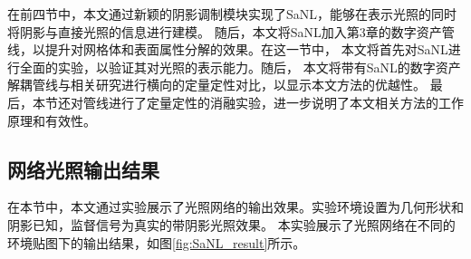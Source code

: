 在前四节中，本文通过新颖的阴影调制模块实现了SaNL，能够在表示光照的同时将阴影与直接光照的信息进行建模。
随后，本文将SaNL加入第3章的数字资产管线，以提升对网格体和表面属性分解的效果。在这一节中，
本文将首先对SaNL进行全面的实验，以验证其对光照的表示能力。随后，
本文将带有SaNL的数字资产解耦管线与相关研究进行横向的定量定性对比，以显示本文方法的优越性。
最后，本节还对管线进行了定量定性的消融实验，进一步说明了本文相关方法的工作原理和有效性。

\subsection{网络光照输出结果}
在本节中，本文通过实验展示了光照网络的输出效果。实验环境设置为几何形状和阴影已知，监督信号为真实的带阴影光照效果。
本实验展示了光照网络在不同的环境贴图下的输出结果，如图\ref{fig:SaNL_result}所示。

